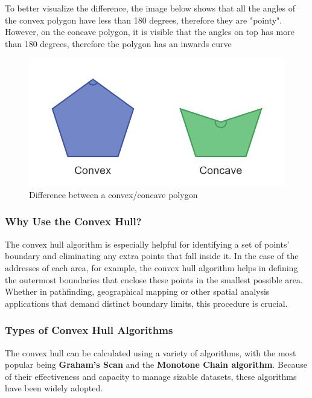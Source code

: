     To better visualize the difference, the image below shows that all the angles of the convex polygon have less than 180 degrees, therefore they are "pointy". However, on the concave polygon, it is visible that the angles on top has more than 180 degrees, therefore the polygon has an inwards curve \autocite{Andi:convexPolygon}

    \begin{figure} [H]
        \centering
        \includegraphics [width=1\textwidth] {images/andreas/areaBorders/convexConcave.png}
        \caption{Difference between a convex/concave polygon \autocite{Andi:concaveConvex}}
        
    \end{figure}

    \subsubsection{Why Use the Convex Hull?}
    The convex hull algorithm is especially helpful for identifying a set of points' boundary and eliminating any extra points that fall inside it. In the case of the addresses of each area, for example, the convex hull algorithm helps in defining the outermost boundaries that enclose these points in the smallest possible area. Whether in pathfinding, geographical mapping or other spatial analysis applications that demand distinct boundary limits, this procedure is crucial.

    \subsubsection{Types of Convex Hull Algorithms}
    The convex hull can be calculated using a variety of algorithms, with the most popular being \textbf{Graham's Scan} and the \textbf{Monotone Chain algorithm}. Because of their effectiveness and capacity to manage sizable datasets, these algorithms have been widely adopted.

